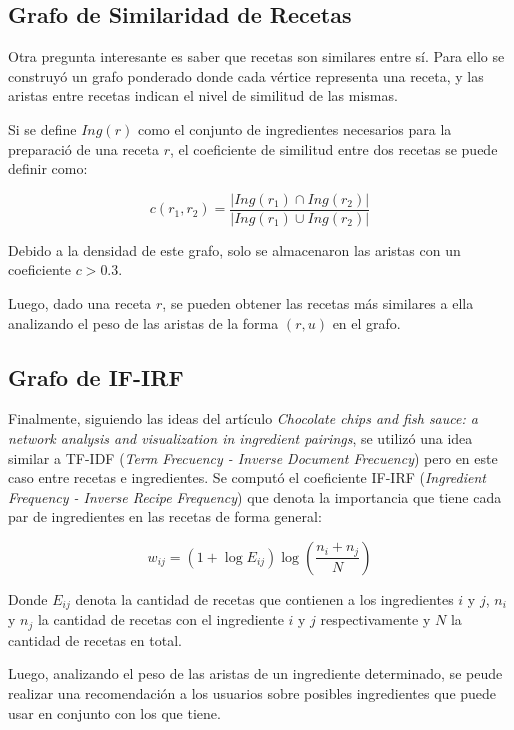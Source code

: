 \documentclass[a4paper]{article}
\begin{document}
\subsection{Grafo de Similaridad de Recetas}\label{sub:sim-rec-graph}

Otra pregunta interesante es saber que recetas son similares entre sí. Para
ello se construyó un grafo ponderado donde cada vértice representa una receta,
y las aristas entre recetas indican el nivel de similitud de las mismas.

Si se define $Ing(r)$ como el conjunto de ingredientes necesarios para la preparació
de una receta $r$, el coeficiente de similitud entre dos recetas se puede definir como:

$$ c(r_1, r_2) = \frac{|Ing(r_1) \cap Ing(r_2)|}{|Ing(r_1) \cup Ing(r_2)|}$$

Debido a la densidad de este grafo, solo se almacenaron las aristas con un 
coeficiente $c > 0.3$.

Luego, dado una receta $r$, se pueden obtener las recetas más similares a ella
analizando el peso de las aristas de la forma $(r, u)$ en el grafo.

\subsection{Grafo de IF-IRF}\label{sub:sim-graph}

Finalmente, siguiendo las ideas del artículo \emph{Chocolate chips and fish
sauce: a network analysis and visualization in ingredient
pairings}\cite{chocolate}, se utilizó una idea similar a TF-IDF (\emph{Term
Frecuency - Inverse Document Frecuency}) pero en este caso entre recetas e
ingredientes. Se computó el coeficiente IF-IRF (\emph{Ingredient Frequency -
Inverse Recipe Frequency}) que denota la importancia que tiene cada par de
ingredientes en las recetas de forma general:

$$w_{ij} = (1 + \log{E_{ij}})\log(\frac{n_i + n_j}{N})$$

Donde $E_{ij}$ denota la cantidad de recetas que contienen a los ingredientes
$i$ y $j$, $n_i$ y $n_j$ la cantidad de recetas con el ingrediente $i$ y $j$
respectivamente y $N$ la cantidad de recetas en total.

Luego, analizando el peso de las aristas de un ingrediente determinado, se peude
realizar una recomendación a los usuarios sobre posibles ingredientes que puede
usar en conjunto con los que tiene.
\end{document}
